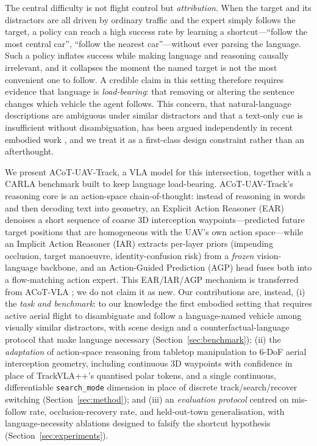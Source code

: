 \documentclass[11pt]{article}
\newcommand{\sys}{ACoT-UAV-Track}
\newcommand{\ear}{EAR}
\newcommand{\iar}{IAR}
\newcommand{\agp}{AGP}
\begin{document}
The central difficulty is not flight control but \emph{attribution}. When
the target and its distractors are all driven by ordinary traffic and the
expert simply follows the target, a policy can reach a high success rate by
learning a shortcut---``follow the most central car'', ``follow the
nearest car''---without ever parsing the language. Such a policy inflates
success while making language and reasoning causally irrelevant, and it
collapses the moment the named target is not the most convenient one to
follow. A credible claim in this setting therefore requires evidence that
language is \emph{load-bearing}: that removing or altering the sentence
changes which vehicle the agent follows. This concern, that natural-language
descriptions are ambiguous under similar distractors and that a text-only
cue is insufficient without disambiguation, has been argued independently in
recent embodied work \citep{uss}, and we treat it as a first-class design
constraint rather than an afterthought.

We present \sys{}, a VLA model for this intersection, together with a CARLA
benchmark built to keep language load-bearing. \sys{}'s reasoning core is an
action-space chain-of-thought: instead of reasoning in words and then
decoding text into geometry, an Explicit Action Reasoner (\ear{}) denoises a
short sequence of coarse 3D interception waypoints---predicted future target
positions that are homogeneous with the UAV's own action space---while an
Implicit Action Reasoner (\iar{}) extracts per-layer priors (impending
occlusion, target manoeuvre, identity-confusion risk) from a \emph{frozen}
vision-language backbone, and an Action-Guided Prediction (\agp{}) head
fuses both into a flow-matching action expert. This EAR/IAR/AGP mechanism is
transferred from ACoT-VLA \citep{acotvla}; we do not claim it as new. Our
contributions are, instead, (i) the \emph{task and benchmark}: to our
knowledge the first embodied setting that requires active aerial flight to
disambiguate and follow a language-named vehicle among visually similar
distractors, with scene design and a counterfactual-language protocol that
make language necessary (Section~\ref{sec:benchmark}); (ii) the
\emph{adaptation} of action-space reasoning from tabletop manipulation to
6-DoF aerial interception geometry, including continuous 3D waypoints with
confidence in place of TrackVLA++'s quantised polar tokens, and a single
continuous, differentiable \texttt{search\_mode} dimension in place of
discrete track/search/recover switching (Section~\ref{sec:method}); and
(iii) an \emph{evaluation protocol} centred on mis-follow rate,
occlusion-recovery rate, and held-out-town generalisation, with
language-necessity ablations designed to falsify the shortcut hypothesis
(Section~\ref{sec:experiments}).
\end{document}
